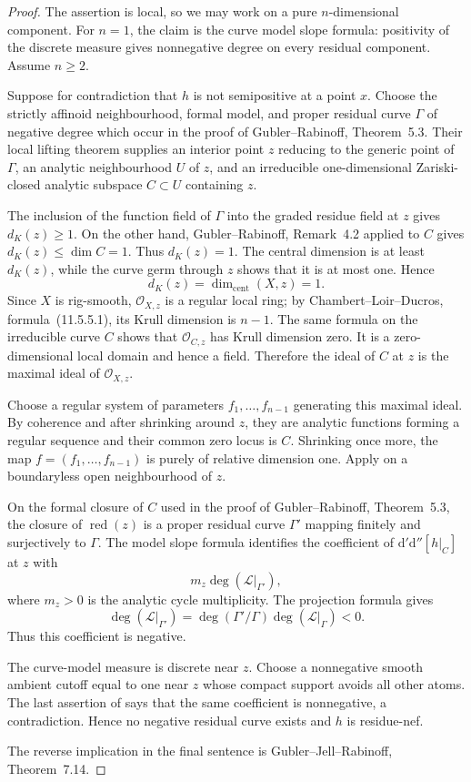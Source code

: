 \begin{proof}
The assertion is local, so we may work on a pure $n$-dimensional component.
For $n=1$, the claim is the curve model slope formula: positivity of the
discrete measure gives nonnegative degree on every residual component.
Assume $n\geq2$.

Suppose for contradiction that $h$ is not semipositive at a point $x$.
Choose the strictly affinoid neighbourhood, formal model, and proper
residual curve $\Gamma$ of negative degree which occur in the proof of
Gubler--Rabinoff, Theorem~5.3.  Their local lifting theorem supplies an
interior point $z$ reducing to the generic point of $\Gamma$, an analytic
neighbourhood $U$ of $z$, and an irreducible one-dimensional Zariski-closed
analytic subspace $C\subset U$ containing $z$.

The inclusion of the function field of $\Gamma$ into the graded residue
field at $z$ gives $d_K(z)\geq1$.  On the other hand, Gubler--Rabinoff,
Remark~4.2 applied to $C$ gives $d_K(z)\leq\dim C=1$.  Thus $d_K(z)=1$.
The central dimension is at least $d_K(z)$, while the curve germ through
$z$ shows that it is at most one.  Hence
\[
                 d_K(z)=\dim_{\mathrm{cent}}(X,z)=1.
\]
Since $X$ is rig-smooth, $\mathcal O_{X,z}$ is a regular local ring; by
Chambert--Loir--Ducros, formula~(11.5.5.1), its Krull dimension is $n-1$.
The same formula on the irreducible curve $C$ shows that
$\mathcal O_{C,z}$ has Krull dimension zero.  It is a zero-dimensional local
domain and hence a field.  Therefore the ideal of $C$ at $z$ is the maximal
ideal of $\mathcal O_{X,z}$.

Choose a regular system of parameters
$f_1,\ldots,f_{n-1}$ generating this maximal ideal.  By coherence and after
shrinking around $z$, they are analytic functions forming a regular
sequence and their common zero locus is $C$.  Shrinking once more, the map
$f=(f_1,\ldots,f_{n-1})$ is purely of relative dimension one.  Apply
 on a boundaryless open
neighbourhood of $z$.

On the formal closure of $C$ used in the proof of Gubler--Rabinoff,
Theorem~5.3, the closure of $\operatorname{red}(z)$ is a proper residual
curve $\Gamma'$ mapping finitely and surjectively to $\Gamma$.  The model
slope formula identifies the coefficient of
$\mathrm d'\mathrm d''[h|_C]$ at $z$ with
\[
  m_z\deg\!\left(\mathcal L|_{\Gamma'}\right),
\]
where $m_z>0$ is the analytic cycle multiplicity.  The projection formula
gives
\[
 \deg\!\left(\mathcal L|_{\Gamma'}\right)
 =\deg(\Gamma'/\Gamma)\deg\!\left(\mathcal L|_\Gamma\right)<0.
\]
Thus this coefficient is negative.

The curve-model measure is discrete near $z$.  Choose a nonnegative smooth
ambient cutoff equal to one near $z$ whose compact support avoids all other
atoms.  The last assertion of
 says that the same coefficient is
nonnegative, a contradiction.  Hence no negative residual curve exists and
$h$ is residue-nef.

The reverse implication in the final sentence is Gubler--Jell--Rabinoff,
Theorem~7.14.
\end{proof}


